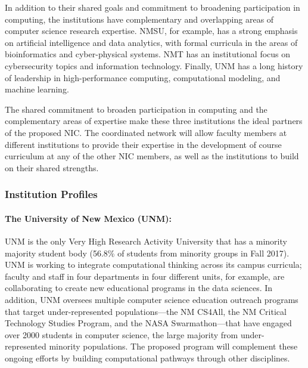 In addition to their shared goals and commitment to broadening participation in computing, the institutions have complementary and overlapping areas of computer science research expertise. 
NMSU, for example, has a strong emphasis on artificial intelligence and data analytics, with formal curricula in the areas of bioinformatics and cyber-physical systems. NMT has an institutional focus on cybersecurity topics and information technology. Finally, UNM has a long history of leadership in high-performance computing, computational modeling, and machine learning.

The shared commitment to broaden participation in computing and the complementary areas of expertise make these three institutions the ideal partners of the proposed NIC. The coordinated network will allow faculty members at different institutions to provide their expertise in the development of course curriculum at any of the other NIC members, as well as the institutions to build on their shared strengths. 

\subsubsection{Institution Profiles}
\paragraph{The University of New Mexico (UNM):}

UNM is the only Very High Research Activity University that has a minority majority student body (56.8\% of students from minority groups in Fall 2017). UNM is working to integrate computational thinking across its campus curricula; %
faculty and staff in four departments in four different units, for example, are collaborating to create new educational programs in the data sciences. In addition, UNM oversees multiple computer science education outreach programs that target under-represented populations---the NM CS4All, the NM Critical Technology Studies Program, and the NASA Swarmathon---that have engaged over 2000 students in computer science, the large majority from under-represented minority populations. The proposed program will complement these ongoing efforts by building computational pathways through other disciplines. 

